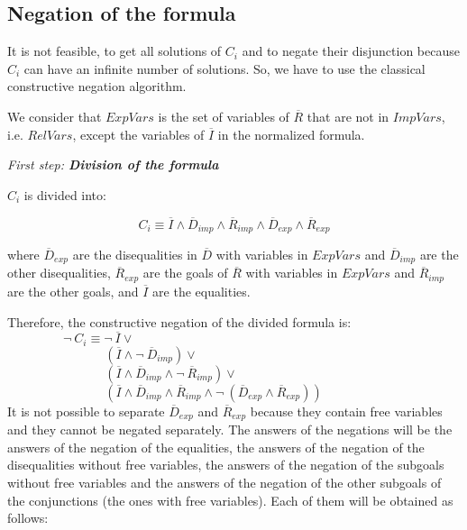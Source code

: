 \documentclass{llncs}
\begin{document}
 


\subsection{Negation of the formula}
\label{negation}

It is not feasible, to get all solutions of $C_i$ and to negate their
disjunction because $C_i$ can have an infinite number of solutions. So,
we have to use the classical constructive negation algorithm.

We consider that $ExpVars$ is the set of variables of $\overline{R}$
that are not in $ImpVars$, i.e. $RelVars$, except the variables of
$\overline{I}$ in the normalized formula.
\medskip

\noindent
{\em First step: {\bf Division of the formula}}

\noindent
$C_i$ is divided into:

\[C_i \equiv \overline{I} \wedge
        \overline{D}_{imp} \wedge \overline{R}_{imp} \wedge
        \overline{D}_{exp} \wedge \overline{R}_{exp} \]

\noindent
where $\overline{D}_{exp}$ are the disequalities in $\overline{D}$
with variables in $ExpVars$ and $\overline{D}_{imp}$ are the other
disequalities, $\overline{R}_{exp}$ are the goals of $\overline{R}$
with variables in $ExpVars$ and $\overline{R}_{imp}$ are the other
goals, and $\overline{I}$ are the equalities.

Therefore, the constructive negation of the divided formula is: \\

$~~~~~~~~~~~~~~~~~~~~\neg~C_i \equiv \neg~\overline{I} \vee $ \\
$~~~~~~~~~~~~~~~~~~~~~~~~~~~~~~~~~~~(\overline{I} \wedge \neg~\overline{D}_{imp}) \vee  $ \\
$~~~~~~~~~~~~~~~~~~~~~~~~~~~~~~~~~~~(\overline{I} \wedge \overline{D}_{imp}  \wedge \neg~\overline{R}_{imp}) \vee $ \\
$~~~~~~~~~~~~~~~~~~~~~~~~~~~~~~~~~~~( \overline{I} \wedge \overline{D}_{imp} \wedge \overline{R}_{imp} \wedge \neg~(\overline{D}_{exp} \wedge \overline{R}_{exp})) $ \\

\noindent
It is not possible to separate $\overline{D}_{exp}$ and
$\overline{R}_{exp}$ because they contain free variables and
they cannot be negated separately. The answers of the negations
will be the answers of the negation of the equalities, the answers of
the negation of the disequalities without free variables, the answers
of the negation of the subgoals without free variables and the answers
of the negation of the other subgoals of the conjunctions (the ones
with free variables). Each of them will be obtained as follows:
\medskip
\end{document}
